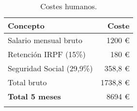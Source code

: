 \begin{longtable}[]{@{}lr@{}}
\toprule
\begin{minipage}[b]{0.38\columnwidth}\raggedright\strut
\textbf{Concepto}\strut
\end{minipage} & \begin{minipage}[b]{0.20\columnwidth}\raggedright\strut
\textbf{Coste}\strut
\end{minipage}\tabularnewline
\midrule
\endhead

\begin{minipage}[t]{0.38\columnwidth}\raggedright\strut
Salario mensual bruto\strut
\end{minipage} & \begin{minipage}[t]{0.20\columnwidth}\raggedright\strut
1200 \euro{}\strut
\end{minipage}\tabularnewline

\begin{minipage}[t]{0.38\columnwidth}\raggedright\strut
Retención IRPF (15\%)\strut
\end{minipage} & \begin{minipage}[t]{0.20\columnwidth}\raggedright\strut
180 \euro{}\strut
\end{minipage}\tabularnewline

\begin{minipage}[t]{0.38\columnwidth}\raggedright\strut
Seguridad Social (29,9\%)\strut
\end{minipage} & \begin{minipage}[t]{0.20\columnwidth}\raggedright\strut
358,8 \euro{}\strut
\end{minipage}\tabularnewline

\begin{minipage}[t]{0.38\columnwidth}\raggedright\strut
Total bruto\strut
\end{minipage} & \begin{minipage}[t]{0.20\columnwidth}\raggedright\strut
1738,8 \euro{}\strut
\end{minipage}\tabularnewline

\midrule

\begin{minipage}[t]{0.38\columnwidth}\raggedright\strut
\textbf{Total 5 meses}\strut
\end{minipage} & \begin{minipage}[t]{0.20\columnwidth}\raggedright\strut
8694 \euro{}\strut
\end{minipage}\tabularnewline
\bottomrule
\caption{Costes humanos.}
\end{longtable}


